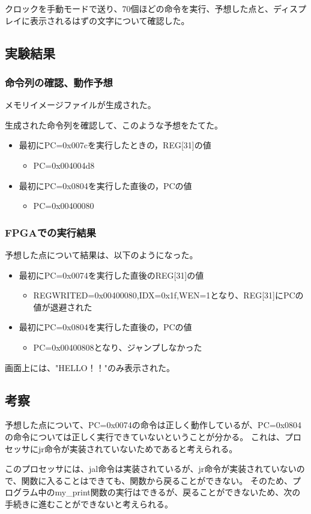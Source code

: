 クロックを手動モードで送り、70個ほどの命令を実行、予想した点と、ディスプレイに表示されるはずの文字について確認した。

\subsection{実験結果}
\subsubsection{命令列の確認、動作予想}
メモリイメージファイルが生成された。
% 

生成された命令列を確認して、このような予想をたてた。
\begin{itemize}
  \item 最初にPC=0x007cを実行したときの，REG[31]の値
        \begin{itemize}
          \item PC=0x004004d8
        \end{itemize}
  \item 最初にPC=0x0804を実行した直後の，PCの値
        \begin{itemize}
          \item PC=0x00400080
        \end{itemize}
\end{itemize}

\subsubsection{FPGAでの実行結果}
予想した点について結果は、以下のようになった。
\begin{itemize}
  \item 最初にPC=0x0074を実行した直後のREG[31]の値
        \begin{itemize}
          \item REGWRITED=0x00400080,IDX=0x1f,WEN=1となり、REG[31]にPCの値が退避された
        \end{itemize}
  \item 最初にPC=0x0804を実行した直後の，PCの値
        \begin{itemize}
          \item PC=0x00400808となり、ジャンプしなかった
        \end{itemize}
\end{itemize}

画面上には、"HELLO！！"のみ表示された。

\subsection{考察}
予想した点について、PC=0x0074の命令は正しく動作しているが、PC=0x0804の命令については正しく実行できていないということが分かる。
これは、プロセッサにjr命令が実装されていないためであると考えられる。

このプロセッサには、jal命令は実装されているが、jr命令が実装されていないので、関数に入ることはできても、関数から戻ることができない。
そのため、プログラム中のmy\_print関数の実行はできるが、戻ることができないため、次の手続きに進むことができないと考えられる。
